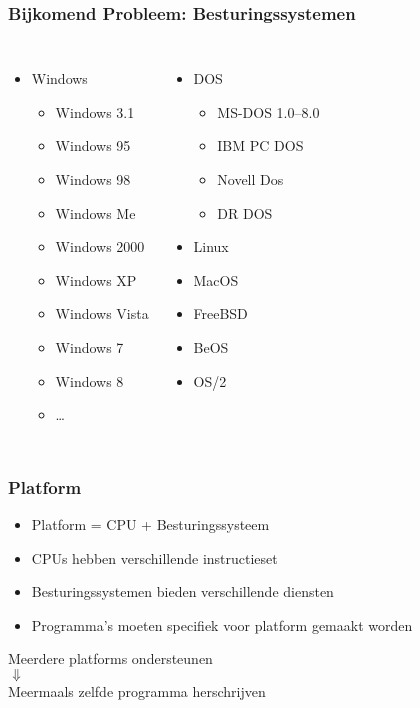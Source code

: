 \begin{frame}
  \frametitle{Bijkomend Probleem: Besturingssystemen}
  \begin{columns}
    \begin{itemize}
      \item Windows
            \begin{itemize}
              \item Windows 3.1
              \item Windows 95
              \item Windows 98
              \item Windows Me
              \item Windows 2000
              \item Windows XP
              \item Windows Vista
              \item Windows 7
              \item Windows 8
              \item \dots
            \end{itemize}
    \end{itemize}
    \begin{itemize}
      \item DOS
            \begin{itemize}
              \item MS-DOS 1.0--8.0
              \item IBM PC DOS
              \item Novell Dos
              \item DR DOS
            \end{itemize}
      \item Linux
      \item MacOS
      \item FreeBSD
      \item BeOS
      \item OS/2
  \end{itemize}
  \end{columns}
\end{frame}

\begin{frame}
  \frametitle{Platform}
  \begin{itemize}
    \item Platform = CPU + Besturingssysteem
    \item CPUs hebben verschillende instructieset
    \item Besturingssystemen bieden verschillende diensten
    \item Programma's moeten specifiek voor platform gemaakt worden
  \end{itemize}
  \vskip5mm
  \begin{center}
    Meerdere platforms ondersteunen \\ $\Downarrow$ \\ Meermaals zelfde programma herschrijven
  \end{center}
\end{frame}

